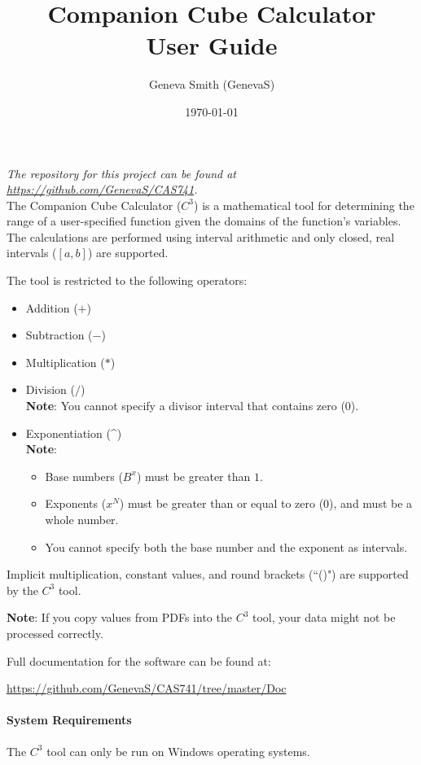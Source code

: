 \documentclass[12pt]{article}
\title{Companion Cube Calculator \\ User Guide}
\author{Geneva Smith (GenevaS)}
\date{\today}
\begin{document}
\maketitle

\textit{The repository for this project can be found at 
\href{https://github.com/GenevaS/CAS741}{https://github.com/GenevaS/CAS741}.}
\\

The Companion Cube Calculator ($C^3$) is a mathematical tool for determining 
the range of a user-specified function given the domains of the function's 
variables. The calculations are performed using interval arithmetic and only 
closed, real intervals ($[a,b]$) are supported.

The tool is restricted to the following operators:
\begin{itemize}
	\item Addition ($+$)
	\item Subtraction ($-$)
	\item Multiplication ($*$) 
	\item Division ($/$) \\ \textbf{Note}: You cannot specify a divisor 
	interval that contains zero ($0$).
	\item Exponentiation (\^{})  \\ \textbf{Note}:	
	\begin{itemize}
		\item Base numbers ($B^x$) must be greater than $1$.
		\item Exponents ($x^N$) must be greater than or equal to zero (0), and 
		must be a whole number.
		\item You cannot specify both the base number and the exponent as 
		intervals.
	\end{itemize}
\end{itemize} 

Implicit multiplication, constant values, and round brackets (``()") are 
supported by the $C^3$ tool.

\textbf{Note}: If you copy values from PDFs into the $C^3$ tool, your data 
might not be processed correctly.

Full documentation for the software can be found at:
\begin{center}
	\url{https://github.com/GenevaS/CAS741/tree/master/Doc}
\end{center}

\paragraph{System Requirements\\}
The $C^3$ tool can only be run on Windows operating systems.
\end{document}
